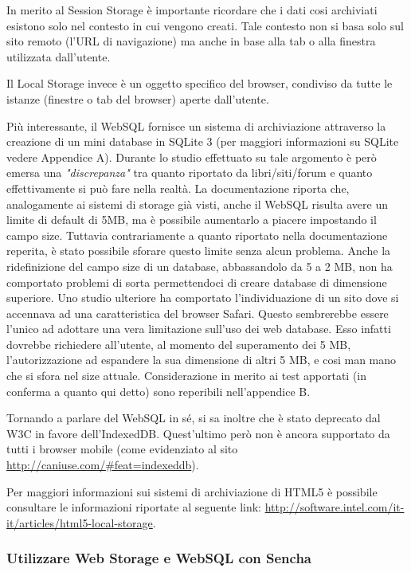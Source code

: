 \documentclass[10pt,a4paper,onecolumn]{article}
\begin{document}
In merito al Session Storage è importante ricordare che i dati cosi archiviati esistono solo nel contesto in cui vengono creati. Tale contesto non si basa solo sul sito remoto (l'URL di navigazione) ma anche in base alla tab o alla finestra utilizzata dall'utente.

Il Local Storage invece è un oggetto specifico del browser, condiviso da tutte le istanze (finestre o tab del browser) aperte dall'utente.

Più interessante, il WebSQL fornisce un sistema di archiviazione attraverso la creazione di un mini database in SQLite 3 (per maggiori informazioni su SQLite vedere Appendice A). Durante lo studio effettuato su tale argomento è però emersa una \textit{"discrepanza"} tra quanto riportato da libri/siti/forum e quanto effettivamente si può fare nella realtà. La documentazione riporta che, analogamente ai sistemi di storage già visti, anche il WebSQL risulta avere un limite di default di 5MB, ma è possibile aumentarlo a piacere impostando il campo size. Tuttavia contrariamente a quanto riportato nella documentazione reperita, è stato possibile sforare questo limite senza alcun problema. Anche la ridefinizione del campo size di un database, abbassandolo da 5 a 2 MB, non ha comportato problemi di sorta permettendoci di creare database di dimensione superiore. Uno studio ulteriore ha comportato l'individuazione di un sito dove si accennava ad una caratteristica del browser Safari. Questo sembrerebbe essere l'unico ad adottare una vera limitazione sull'uso dei web database. Esso infatti dovrebbe richiedere all'utente, al momento del superamento dei 5 MB, l'autorizzazione ad espandere la sua dimensione di altri 5 MB, e cosi man mano che si sfora nel size attuale. Considerazione in merito ai test apportati (in conferma a quanto qui detto) sono reperibili nell'appendice B. 

Tornando a parlare del WebSQL in sé, si sa inoltre che è stato deprecato dal W3C in favore dell'IndexedDB. Quest'ultimo però non è ancora supportato da tutti i browser mobile (come evidenziato al sito \url{http://caniuse.com/#feat=indexeddb}).

Per maggiori informazioni sui sistemi di archiviazione di HTML5 è possibile consultare le informazioni riportate al seguente link: \url{http://software.intel.com/it-it/articles/html5-local-storage}.

\subsubsection{Utilizzare Web Storage e WebSQL con Sencha}
\end{document}
